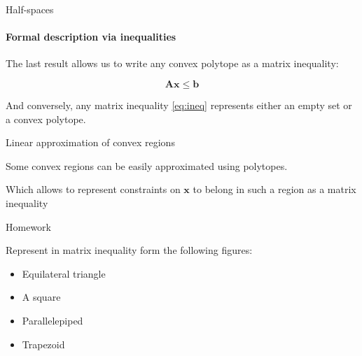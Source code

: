 \documentclass{beamer}
\begin{document}
\begin{frame}{Half-spaces}
\framesubtitle{Formal description via inequalities}
\begin{flushleft}

The last result allows us to write any convex polytope as a matrix inequality:

\begin{equation}
\label{eq:ineq} 
    \mathbf{A} \mathbf{x} \leq  \mathbf{b} 
\end{equation}

And conversely, any matrix inequality \eqref{eq:ineq} represents either an empty set or a convex polytope.
 
\end{flushleft}
\end{frame}




\begin{frame}{Linear approximation of convex regions}
\begin{flushleft}
Some convex regions can be easily approximated using polytopes.



Which allows to represent constraints on $\mathbf{x}$ to belong in such a region as a matrix inequality
 
\end{flushleft}
\end{frame}



\begin{frame}{Homework}
\begin{flushleft}

Represent in matrix inequality form the following figures:

\begin{itemize}
    \item Equilateral triangle
    \item A square
    \item Parallelepiped
    \item Trapezoid
\end{itemize}

\end{flushleft}
\end{frame}


\end{document}
